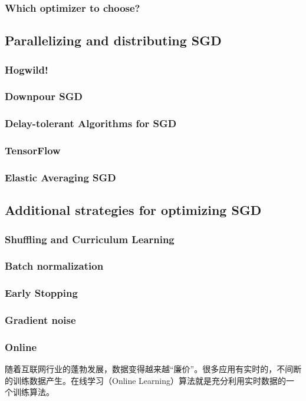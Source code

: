 \documentclass[a4paper,10pt]{ctexbook}
\begin{document}
\subsubsection{Which optimizer to choose?}

\subsection{Parallelizing and distributing SGD}
\subsubsection{Hogwild!}
\subsubsection{Downpour SGD}
\subsubsection{Delay-tolerant Algorithms for SGD}
\subsubsection{TensorFlow}

\subsubsection{Elastic Averaging SGD}
\subsection{Additional strategies for optimizing SGD}
\subsubsection{Shuffling and Curriculum Learning}
\subsubsection{Batch normalization}

\subsubsection{Early Stopping}
\subsubsection{Gradient noise}


\subsubsection{Online}
随着互联网行业的蓬勃发展，数据变得越来越``廉价''。很多应用有实时的，不间断的训练数据产生。在线学习（Online Learning）算法就是充分利用实时数据的一个训练算法。
\end{document}
